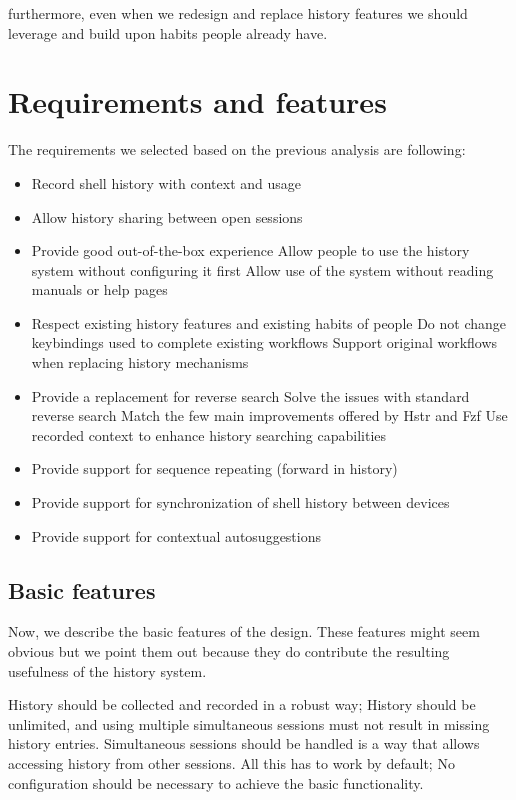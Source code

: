 \documentclass[thesis=M,english]{FITthesis}[2012/10/20]
\begin{document}
furthermore, even when we redesign and replace history features we should leverage and build upon habits people already have.


\newpage
\section{Requirements and features}


The requirements we selected based on the previous analysis are following:

\begin{itemize}
    \item Record shell history with context and usage
    \item Allow history sharing between open sessions
    \item Provide good out-of-the-box experience
    \subitem Allow people to use the history system without configuring it first
    \subitem Allow use of the system without reading manuals or help pages
    \item Respect existing history features and existing habits of people
    \subitem Do not change keybindings used to complete existing workflows
    \subitem Support original workflows when replacing history mechanisms
    \item Provide a replacement for reverse search
    \subitem Solve the issues with standard reverse search
    \subitem Match the few main improvements offered by Hstr and Fzf
    \subitem Use recorded context to enhance history searching capabilities
    \item Provide support for sequence repeating (forward in history)
    \item Provide support for synchronization of shell history between devices
    \item Provide support for contextual autosuggestions
\end{itemize}



\subsection{Basic features}

Now, we describe the basic features of the design. These features might seem obvious but we point them out because they do contribute the resulting usefulness of the history system.

History should be collected and recorded in a robust way; History should be unlimited, and using multiple simultaneous sessions must not result in missing history entries. 
Simultaneous sessions should be handled is a way that allows accessing history from other sessions.
All this has to work by default; No configuration should be necessary to achieve the basic functionality. 
\end{document}
